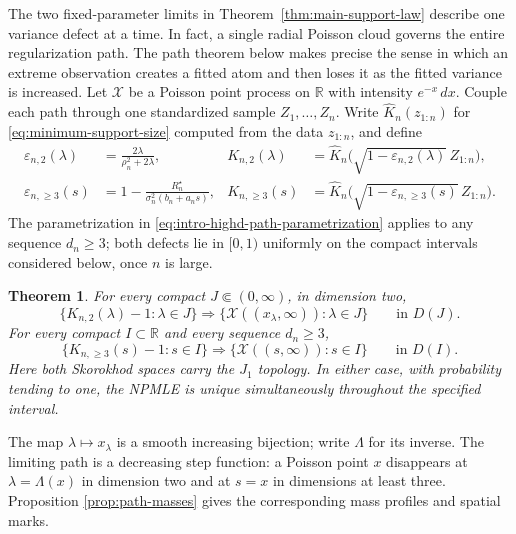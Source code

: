 \documentclass[11pt]{article}
\newtheorem{theorem}{Theorem}[section]
\theoremstyle{remark}
\numberwithin{equation}{section}
\newcommand{\R}{\mathbb R}
\newcommand{\eps}{\varepsilon}
\newcommand{\wh}{\widehat}
\begin{document}
The two fixed-parameter limits in Theorem~\ref{thm:main-support-law} describe
one variance defect at a time. In fact, a single radial Poisson cloud governs
the entire regularization path. The path theorem below
makes precise the sense in which an extreme observation creates a fitted atom
and then loses it as the fitted variance is increased. Let \(\mathcal X\) be a
Poisson point process on \(\R\) with intensity \(e^{-x}\,dx\). Couple each path
through one standardized sample \(Z_1,\ldots,Z_n\). Write
\(\wh K_n(z_{1:n})\) for \eqref{eq:minimum-support-size} computed from the data
\(z_{1:n}\), and define
\begin{align}
\label{eq:intro-d2-path-parametrization}
 \eps_{n,2}(\lambda)
 &=\frac{2\lambda}{\rho_n^2+2\lambda},
 &K_{n,2}(\lambda)
 &=\wh K_n\bigl(\sqrt{1-\eps_{n,2}(\lambda)}\,Z_{1:n}\bigr),\\
\label{eq:intro-highd-path-parametrization}
 \eps_{n,\ge3}(s)
 &=1-\frac{R_n^\star}{\sigma_n^2(b_n+a_ns)},
 &K_{n,\ge3}(s)
 &=\wh K_n\bigl(\sqrt{1-\eps_{n,\ge3}(s)}\,Z_{1:n}\bigr).
\end{align}
The parametrization in \eqref{eq:intro-highd-path-parametrization} applies to
any sequence \(d_n\ge3\); both defects lie in
\([0,1)\) uniformly
on the compact intervals considered below, once \(n\) is large.

\begin{theorem}
\label{thm:regularization-path}
For every compact \(J\Subset(0,\infty)\), in dimension two,
\begin{equation}
\label{eq:intro-d2-path-limit}
 \{K_{n,2}(\lambda)-1:\lambda\in J\}
 \Longrightarrow
 \{\mathcal X((x_\lambda,\infty)):\lambda\in J\}
 \qquad\text{in }D(J).
\end{equation}
For every compact \(I\subset\R\) and every sequence \(d_n\ge3\),
\begin{equation}
\label{eq:intro-highd-path-limit}
 \{K_{n,\ge3}(s)-1:s\in I\}
 \Longrightarrow
 \{\mathcal X((s,\infty)):s\in I\}
 \qquad\text{in }D(I).
\end{equation}
Here both Skorokhod spaces carry the \(J_1\) topology. In either case, with
probability tending to one, the NPMLE is unique simultaneously throughout the
specified interval.
\end{theorem}

The map \(\lambda\mapsto x_\lambda\) is a smooth increasing bijection; write
\(\Lambda\) for its inverse. The limiting path is a decreasing step function:
a Poisson point \(x\) disappears at \(\lambda=\Lambda(x)\) in dimension two
and at \(s=x\) in dimensions at least three. Proposition
\ref{prop:path-masses} gives the corresponding mass profiles and spatial marks.
\end{document}
